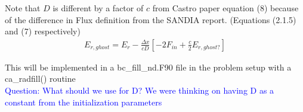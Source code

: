 \documentclass[11pt]{article}
\begin{document}
Note that $D$ is different by a factor of $c$ from Castro paper equation (8) because of the difference in Flux definition from the SANDIA report. (Equations (2.1.5) and (7) respectively) \\

	\begin{align*}
		E_{r,ghost} = E_r - \frac{\Delta x}{c D} \left[ -2 F_{in} + \frac{c}{2} E_{r,ghost?}\right]
	\end{align*}
	
	This will be implemented in a bc\_fill\_nd.F90 file in the problem setup with a ca\_radfill() routine\\ 
	
	\textcolor{blue}{Question: What should we use for D? We were thinking on having D as a constant from the initialization parameters}

	{}
    
\end{document}
